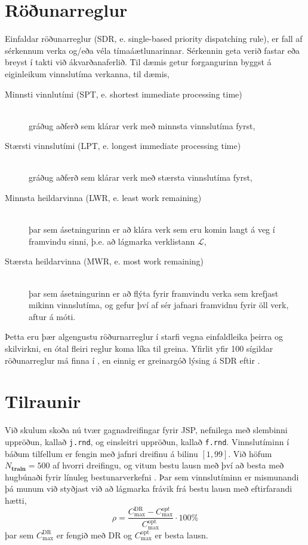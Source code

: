 \documentclass[]{article}
\begin{document}
\section{Röðunarreglur}
Einfaldar röðunarreglur (SDR, e. single-based priority dispatching rule), er 
fall af sérkennum verka og/eða véla tímaáætlunarinnar. Sérkennin geta verið 
fastar eða breyst í takti við ákvarðanaferlið. Til dæmis getur forgangurinn 
byggst á eiginleikum vinnslutíma verkanna, til dæmis, 
\begin{description}
    \item[Minnsti vinnlutími (SPT, e. shortest immediate processing time)] 
    \hfill \\ gráðug aðferð sem klárar verk með minnsta vinnslutíma fyrst, 
    \item[Stærsti vinnslutími (LPT, e. longest immediate processing time)] 
    \hfill \\ gráðug aðferð sem klárar verk með stærsta vinnslutíma fyrst, 
    \item[Minnsta heildarvinna (LWR, e. least work remaining)] \hfill \\
    þar sem ásetningurinn er að klára verk sem eru komin langt á veg í 
    framvindu sinni, þ.e. að lágmarka verklistann $\mathcal{L}$,
    \item[Stærsta heildarvinna (MWR, e. most work remaining)] \hfill \\
    þar sem ásetningurinn er að flýta fyrir framvindu verka sem krefjast mikinn 
    vinnslutíma, og gefur því af sér jafnari framvidnu fyrir öll verk, aftur á 
    móti.
\end{description}
Þetta eru þær algengustu röðurnarreglur í starfi vegna einfaldleika þeirra og 
skilvirkni, en ótal fleiri reglur koma líka til greina. Yfirlit yfir 100 
sígildar röðunarreglur má finna í \citet{Panwalkar77}, en einnig er greinargóð 
lýsing á SDR eftir \citet{Haupt89}. 

\section{Tilraunir}
Við skulum skoða nú tvær gagnadreifingar fyrir JSP, nefnilega með slembinni 
uppröðun, kallað \texttt{j.rnd}, og einsleitri uppröðun, kallað \texttt{f.rnd}. 
Vinnslutíminn í báðum tilfellum er fengin með jafnri dreifinu á bilinu $[1,99]$.
Við höfum $N_{\textbf{train}}=500$ af hvorri dreifingu, og vitum bestu lausn 
með því að besta með hugbúnaði fyrir línuleg bestunarverkefni \citep{gurobi}. 
Þar sem vinnslutíminn er mismunandi þá munum við styðjast við að lágmarka 
frávik frá bestu lausn með eftirfarandi hætti, 
\begin{equation}
\rho=\frac{C_{\max}^{\text{DR}}-C_{\max}^{opt}}{C_{\max}^{\text{opt}}}\cdot 
100\%
\end{equation}
þar sem $C_{\max}^{\text{DR}}$ er fengið með DR og $C_{\max}^{\text{opt}}$ er 
besta lausn. 
\end{document}
